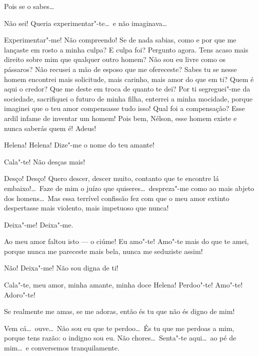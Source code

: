 {   Pois se o sabes\ldots

   Não sei! Queria
experimentar"-te\ldots\ e não imaginava\ldots

   Experimentar"-me! Não
compreendo! Se de nada sabias, como e por que me lançaste em rosto a
minha culpa? E culpa foi? Pergunto agora. Tens acaso mais direito sobre
mim que qualquer outro homem? Não sou eu livre como os pássaros? Não
recusei a mão de esposo que me ofereceste? Sabes tu se nesse homem
encontrei mais solicitude, mais carinho, mais amor do que em ti? Quem é
aqui o credor? Que me deste em troca de quanto te dei? Por ti
segreguei"-me da sociedade, sacrifiquei o futuro de minha filha,
enterrei a minha mocidade, porque imaginei que o teu amor compensasse
tudo isso! Qual foi a compensação? Esse ardil infame de inventar um
homem! Pois bem, Nélson, esse homem existe e nunca saberás quem é!
Adeus!

  Helena!
Helena! Dize"-me o nome do teu amante!

  Cala"-te! Não desças mais!

 
Desço! Desço! Quero descer, descer muito, contanto que te
encontre lá embaixo!\ldots\ Faze de mim o juízo que quiseres\ldots\ despreza"-me
como ao mais abjeto dos homens\ldots\ Mas essa terrível confissão fez com
que o meu amor extinto despertasse mais violento, mais impetuoso que
nunca!

  Deixa"-me! Deixa"-me.

  Ao meu amor faltou isto --- o ciúme! Eu amo"-te!
Amo"-te mais do que te amei, porque nunca me pareceste mais bela, nunca
me seduziste assim!

  Não! Deixa"-me! Não sou digna de ti!

  Cala"-te, meu amor, minha amante, minha doce
Helena! Perdoo"-te! Amo"-te! Adoro"-te!

  Se realmente me amas, se me adoras, então és
tu que não és digno de mim! 

   Vem cá\ldots\ 
ouve\ldots\ Não sou eu que te perdoo\ldots\ És tu que me perdoas a mim, porque
tens razão: o indigno sou eu. \paren{Helena finge que chora.} Não
chores\ldots\ Senta"-te aqui\ldots\ ao pé de mim\ldots\ e conversemos
tranquilamente. 

}

